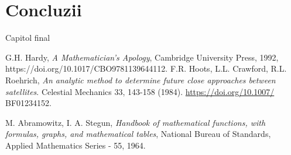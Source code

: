 \documentclass[11pt,a4paper]{report}
\begin{document}
\chapter{Concluzii}
Capitol final

\begin{thebibliography}{99}

 G.H. Hardy, {\it A Mathematician's Apology}, Cambridge University Press, 1992,
    https://doi.org/10.1017/CBO9781139644112.
 F.R. Hoots, L.L. Crawford, R.L. Roehrich, {\it An analytic method to determine future close approaches between satellites}. Celestial Mechanics 33, 143-158 (1984). \href{https://doi.org/10.1007/}{https://doi.org/10.1007/} BF01234152.

 M. Abramowitz, I. A. Stegun, {\it Handbook of mathematical functions, with formulas, graphs, and mathematical tables}, National Bureau of Standards, Applied Mathematics Series - 55, 1964.

\end{thebibliography}
\end{document}
